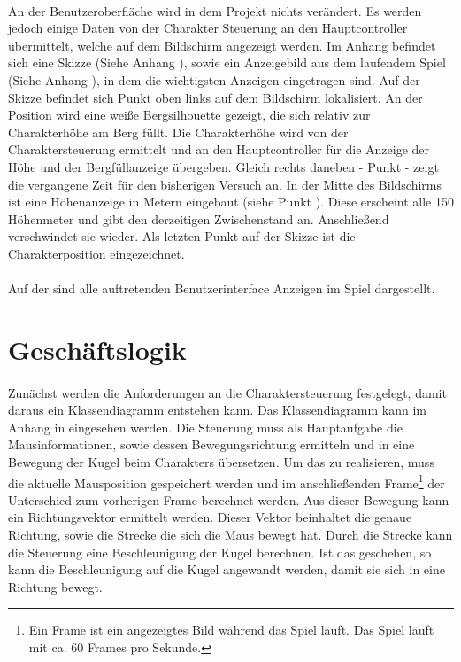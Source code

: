 \paragraph{}
An der Benutzeroberfläche wird in dem Projekt nichts verändert. Es werden jedoch einige Daten von der Charakter Steuerung an den Hauptcontroller übermittelt, welche auf dem Bildschirm angezeigt werden. Im Anhang befindet sich eine Skizze (Siehe Anhang ), sowie ein Anzeigebild aus dem laufendem Spiel (Siehe Anhang ), in dem die wichtigsten Anzeigen eingetragen sind. Auf der Skizze befindet sich Punkt  oben links auf dem Bildschirm lokalisiert. An der Position wird eine weiße Bergsilhouette gezeigt, die sich relativ zur Charakterhöhe am Berg füllt. Die Charakterhöhe wird von der Charaktersteuerung ermittelt und an den Hauptcontroller für die Anzeige der Höhe und der Bergfüllanzeige übergeben. Gleich rechts daneben - Punkt  - zeigt die vergangene Zeit für den bisherigen Versuch an. In der Mitte des Bildschirms ist eine Höhenanzeige in Metern eingebaut (siehe Punkt ). Diese erscheint alle 150 Höhenmeter und gibt den derzeitigen Zwischenstand an. Anschließend verschwindet sie wieder. Als letzten Punkt auf der Skizze ist die Charakterposition eingezeichnet.
\paragraph{}
Auf der  sind alle auftretenden Benutzerinterface Anzeigen im Spiel dargestellt.

\section{Geschäftslogik}
\paragraph{}
Zunächst werden die Anforderungen an die Charaktersteuerung festgelegt, damit daraus ein Klassendiagramm entstehen kann. Das Klassendiagramm kann im Anhang in  eingesehen werden. Die Steuerung muss als Hauptaufgabe die Mausinformationen, sowie dessen Bewegungsrichtung ermitteln und in eine Bewegung der Kugel beim Charakters übersetzen. Um das zu realisieren, muss die aktuelle Mausposition gespeichert werden und im anschließenden Frame\footnote{Ein Frame ist ein angezeigtes Bild während das Spiel läuft. Das Spiel läuft mit ca. 60 Frames pro Sekunde.} der Unterschied zum vorherigen Frame berechnet werden. Aus dieser Bewegung kann ein Richtungsvektor ermittelt werden. Dieser Vektor beinhaltet die genaue Richtung, sowie die Strecke die sich die Maus bewegt hat. Durch die Strecke kann die Steuerung eine Beschleunigung der Kugel berechnen. Ist das geschehen, so kann die Beschleunigung auf die Kugel angewandt werden, damit sie sich in eine Richtung bewegt.
